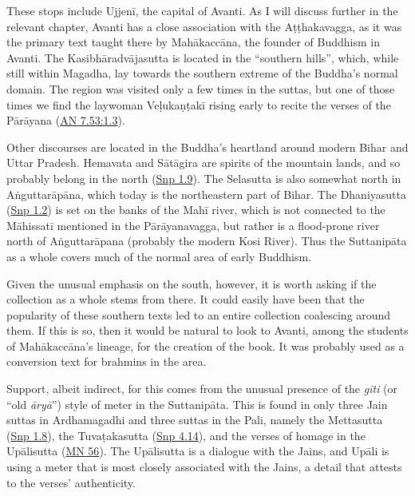 \documentclass[12pt,openany]{book}%
\begin{document}
These stops include \textsanskrit{Ujjenī}, the capital of Avanti. As I will discuss further in the relevant chapter, Avanti has a close association with the \textsanskrit{Aṭṭhakavagga}, as it was the primary text taught there by \textsanskrit{Mahākaccāna}, the founder of Buddhism in Avanti. The \textsanskrit{Kasibhāradvājasutta} is located in the “southern hills”, which, while still within Magadha, lay towards the southern extreme of the Buddha’s normal domain. The region was visited only a few times in the suttas, but one of those times we find the laywoman \textsanskrit{Veḷukaṇṭakī} rising early to recite the verses of the \textsanskrit{Pārāyana} (\href{https://suttacentral.net/an7.53/en/sujato\#1.3}{AN 7.53:1.3}).

Other discourses are located in the Buddha’s heartland around modern Bihar and Uttar Pradesh. Hemavata and \textsanskrit{Sātāgira} are spirits of the mountain lands, and so probably belong in the north (\href{https://suttacentral.net/snp1.9/en/sujato}{Snp 1.9}). The Selasutta is also somewhat north in \textsanskrit{Aṅguttarāpāna}, which today is the northeastern part of Bihar. The Dhaniyasutta (\href{https://suttacentral.net/snp1.2/en/sujato}{Snp 1.2}) is set on the banks of the \textsanskrit{Mahī} river, which is not connected to the \textsanskrit{Māhissatī} mentioned in the \textsanskrit{Pārāyanavagga}, but rather is a flood-prone river north of \textsanskrit{Aṅguttarāpana} (probably the modern Kosi River). Thus the \textsanskrit{Suttanipāta} as a whole covers much of the normal area of early Buddhism.

Given the unusual emphasis on the south, however, it is worth asking if the collection as a whole stems from there. It could easily have been that the popularity of these southern texts led to an entire collection coalescing around them. If this is so, then it would be natural to look to Avanti, among the students of \textsanskrit{Mahākaccāna}’s lineage, for the creation of the book. It was probably used as a conversion text for brahmins in the area.

Support, albeit indirect, for this comes from the unusual presence of the \textit{\textsanskrit{gīti}} (or “old \textit{\textsanskrit{āryā}}”) style of meter in the \textsanskrit{Suttanipāta}. This is found in only three Jain suttas in Ardhamagadhi and three suttas in the Pali, namely the Mettasutta (\href{https://suttacentral.net/snp1.8/en/sujato}{Snp 1.8}), the \textsanskrit{Tuvaṭakasutta} (\href{https://suttacentral.net/snp4.14/en/sujato}{Snp 4.14}), and the verses of homage in the \textsanskrit{Upālisutta} (\href{https://suttacentral.net/mn56/en/sujato}{MN 56}). The \textsanskrit{Upālisutta} is a dialogue with the Jains, and \textsanskrit{Upāli} is using a meter that is most closely associated with the Jains, a detail that attests to the verses’ authenticity.
\end{document}

